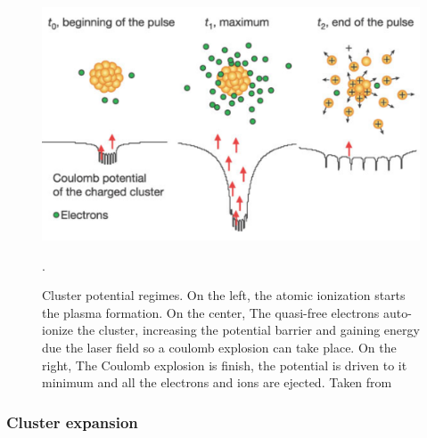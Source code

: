 \begin{figure}[hbtp] \label{img:clusterpotential}

\centering
\includegraphics[scale=0.35]{../Images/clusterpotential.PNG}
\caption[Cluster potential regimes]{Cluster potential regimes. On the left, the atomic ionization starts the plasma formation. On the center, The quasi-free electrons auto-ionize the cluster, increasing the potential barrier and  gaining energy due the laser field so a coulomb explosion can take place. On the right, The Coulomb explosion is finish, the potential is driven to it minimum and all the electrons and ions are ejected. Taken from \cite{wabnitz_multiple_2002}}.
\end{figure}

\subsubsection{Cluster expansion}

